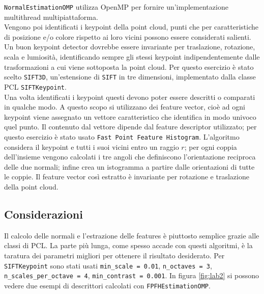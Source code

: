 \documentclass[a4paper]{article}
\begin{document}
	\verb|NormalEstimationOMP| utilizza OpenMP per fornire un'implementazione multithread multipiattaforma. \\
	Vengono poi identificati i keypoint della point cloud, punti che per caratteristiche di posizione e/o colore rispetto ai loro vicini possono essere considerati salienti. Un buon keypoint detector dovrebbe essere invariante per traslazione, rotazione, scala e lumiosità, identificando sempre gli stessi keypoint indipendentemente dalle trasformazioni a cui viene sottoposta la point cloud. Per questo esercizio è stato scelto \verb|SIFT3D|, un'estensione di \verb|SIFT| in tre dimensioni, implementato dalla classe PCL \verb|SIFTKeypoint|. \\
	Una volta identificati i keypoint questi devono poter essere descritti o comparati in qualche modo. A questo scopo si utilizzano dei feature vector, cioè ad ogni keypoint viene assegnato un vettore caratteristico che identifica in modo univoco quel punto. Il contenuto dal vettore dipende dal feature descriptor utilizzato; per questo esercizio è stato usato \verb|Fast Point Feature Histogram|. L'algoritmo considera il keypoint e tutti i suoi vicini entro un raggio $r$; per ogni coppia dell'insieme vengono calcolati i tre angoli che definiscono l'orientazione reciproca delle due normali; infine crea un istogramma a partire dalle orientazioni di tutte le coppie. Il feature vector così estratto è invariante per rotazione e traslazione della point cloud.

	\subsection{Considerazioni}
	Il calcolo delle normali e l'estrazione delle features è piuttosto semplice grazie alle classi di PCL. La parte più lunga, come spesso accade con questi algoritmi, è la taratura dei parametri migliori per ottenere il risultato desiderato. Per \verb|SIFTKeypoint| sono stati usati \verb|min_scale = 0.01|, \verb|n_octaves = 3|, \verb|n_scales_per_octave = 4|, \verb|min_contrast = 0.001|. In figura \ref{fig:lab2} si possono vedere due esempi di descrittori calcolati con \verb|FPFHEstimationOMP|.
	
\end{document}
